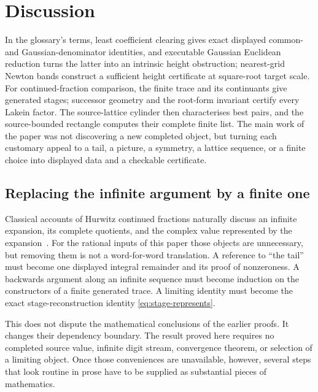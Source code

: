\documentclass[11pt]{article}
\begin{document}
\section{Discussion}
\label{sec:discussion}

In the glossary's terms, least coefficient clearing gives exact displayed
common- and Gaussian-denominator identities, and executable Gaussian
Euclidean reduction turns the latter into an intrinsic height obstruction;
nearest-grid Newton bands construct a sufficient height certificate at
square-root target scale.  For
continued-fraction comparison, the finite trace and its continuants give
generated stages; successor geometry and the root-form invariant certify
every Lakein factor.  The source-lattice cylinder then characterises best
pairs, and the source-bounded rectangle computes their complete finite list.
The main work of the paper was not discovering a new completed object, but
turning each customary appeal to a tail, a picture, a symmetry, a lattice
sequence, or a finite choice into displayed data and a checkable certificate.

\subsection{Replacing the infinite argument by a finite one}

Classical accounts of Hurwitz continued fractions naturally discuss an
infinite expansion, its complete quotients, and the complex value represented
by the expansion~\cite{HurwitzComplexCF,LeVequeGaussianCF,LakeinApproximation}.
For the rational inputs of this paper those objects are unnecessary, but
removing them is not a word-for-word translation.  A reference to ``the
tail'' must become one displayed integral remainder and its proof of
nonzeroness.  A backwards argument along an infinite sequence must become
induction on the constructors of a finite generated trace.  A limiting
identity must become the exact stage-reconstruction identity
\eqref{eq:stage-represents}.

This does not dispute the mathematical conclusions of the earlier proofs.
It changes their dependency boundary.  The result proved here requires no
completed source value, infinite digit stream, convergence theorem, or
selection of a limiting object.  Once those conveniences are unavailable,
however, several steps that look routine in prose have to be supplied as
substantial pieces of mathematics.
\end{document}
